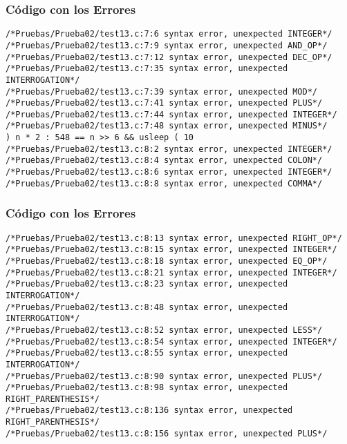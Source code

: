 \documentclass{beamer}
\begin{document}
\begin{frame}[fragile]
\frametitle{C\'odigo con los Errores}
\begin{verbatim}
/*Pruebas/Prueba02/test13.c:7:6 syntax error, unexpected INTEGER*/
/*Pruebas/Prueba02/test13.c:7:9 syntax error, unexpected AND_OP*/
/*Pruebas/Prueba02/test13.c:7:12 syntax error, unexpected DEC_OP*/
/*Pruebas/Prueba02/test13.c:7:35 syntax error, unexpected INTERROGATION*/
/*Pruebas/Prueba02/test13.c:7:39 syntax error, unexpected MOD*/
/*Pruebas/Prueba02/test13.c:7:41 syntax error, unexpected PLUS*/
/*Pruebas/Prueba02/test13.c:7:44 syntax error, unexpected INTEGER*/
/*Pruebas/Prueba02/test13.c:7:48 syntax error, unexpected MINUS*/
) n * 2 : 548 == n >> 6 && usleep ( 10 
/*Pruebas/Prueba02/test13.c:8:2 syntax error, unexpected INTEGER*/
/*Pruebas/Prueba02/test13.c:8:4 syntax error, unexpected COLON*/
/*Pruebas/Prueba02/test13.c:8:6 syntax error, unexpected INTEGER*/
/*Pruebas/Prueba02/test13.c:8:8 syntax error, unexpected COMMA*/
\end{verbatim}
\end{frame}
\begin{frame}[fragile]
\frametitle{C\'odigo con los Errores}
\begin{verbatim}
/*Pruebas/Prueba02/test13.c:8:13 syntax error, unexpected RIGHT_OP*/
/*Pruebas/Prueba02/test13.c:8:15 syntax error, unexpected INTEGER*/
/*Pruebas/Prueba02/test13.c:8:18 syntax error, unexpected EQ_OP*/
/*Pruebas/Prueba02/test13.c:8:21 syntax error, unexpected INTEGER*/
/*Pruebas/Prueba02/test13.c:8:23 syntax error, unexpected INTERROGATION*/
/*Pruebas/Prueba02/test13.c:8:48 syntax error, unexpected INTERROGATION*/
/*Pruebas/Prueba02/test13.c:8:52 syntax error, unexpected LESS*/
/*Pruebas/Prueba02/test13.c:8:54 syntax error, unexpected INTEGER*/
/*Pruebas/Prueba02/test13.c:8:55 syntax error, unexpected INTERROGATION*/
/*Pruebas/Prueba02/test13.c:8:90 syntax error, unexpected PLUS*/
/*Pruebas/Prueba02/test13.c:8:98 syntax error, unexpected RIGHT_PARENTHESIS*/
/*Pruebas/Prueba02/test13.c:8:136 syntax error, unexpected RIGHT_PARENTHESIS*/
/*Pruebas/Prueba02/test13.c:8:156 syntax error, unexpected PLUS*/
\end{verbatim}
\end{frame}
\end{document}
